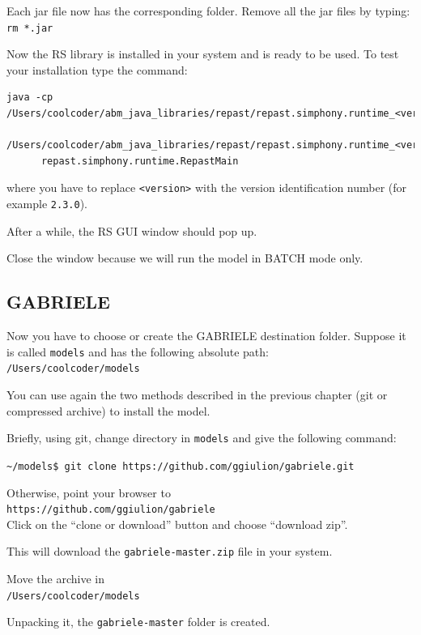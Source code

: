 \documentclass{book}
\begin{document}
Each jar file now has the corresponding folder.
Remove all the jar files by typing:\\
\verb+rm *.jar+

Now the RS library is installed in your system and is ready to be used.
To test your installation type the command:\\
\begin{verbatim}
java -cp /Users/coolcoder/abm_java_libraries/repast/repast.simphony.runtime_<version>/lib/*:
         /Users/coolcoder/abm_java_libraries/repast/repast.simphony.runtime_<version>/bin 
	  repast.simphony.runtime.RepastMain
\end{verbatim}
where you have to replace \verb+<version>+ with the version identification number (for example \verb+2.3.0+).

After a while, the RS GUI window should pop up.

Close the window because we will run the model in BATCH mode only.



\subsection{GABRIELE}

Now you have to choose or create the GABRIELE destination folder.
Suppose it is called \verb+models+ and has the following absolute path: \\
\verb+/Users/coolcoder/models+

You can use again the two methods described in the previous chapter (git or compressed archive) to install the model. 

Briefly, using git, change directory in \verb+models+ and give the following command:

\vskip2mm
\noindent\verb+~/models$ +\color{red}\verb+git clone https://github.com/ggiulion/gabriele.git+ \color{black}

\vskip2mm

Otherwise, point your browser to\\ 
\verb+https://github.com/ggiulion/gabriele+\\
Click on the ``clone or download'' button and choose ``download zip''.

This will download the \verb+gabriele-master.zip+ file in your system.

Move the archive in\\
\verb+/Users/coolcoder/models+

Unpacking it, the \verb+gabriele-master+ folder is created.
\end{document}

